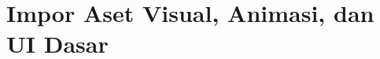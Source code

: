 \documentclass[../../main.tex]{subfiles}
\begin{document}
\chapter{Impor Aset Visual, Animasi, dan UI Dasar}
\label{chap:aset-visual}
























\ifSubfilesClassLoaded{%
  \clearpage
}{}
\end{document}
